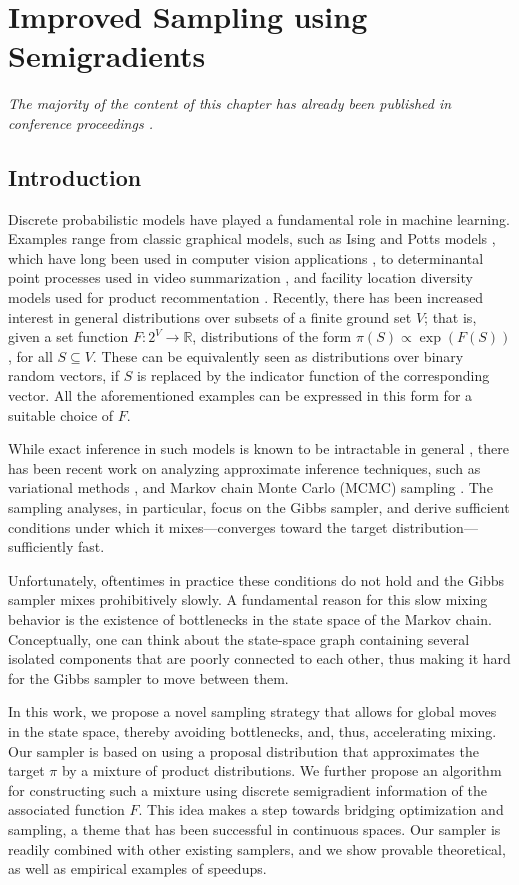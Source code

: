 \chapter{Improved Sampling using Semigradients} \label{ch:m3}

\emph{The majority of the content of this chapter has already been published in conference proceedings \citep{gotovos18}.}

\section{Introduction}
Discrete probabilistic models have played a fundamental role in machine learning.
Examples range from classic graphical models, such as Ising and Potts models \citep{koller09}, which have long been used in computer vision applications \citep{boykov01}, to determinantal point processes \citep{kulesza12} used in video summarization \citep{gong14}, and facility location diversity models used for product recommentation \citep{tschiatschek16}.
Recently, there has been increased interest in general distributions over subsets of a finite ground set $V$; that is, given a set function $F : 2^V \to \mathbb{R}$, distributions of the form $\pi(S) \propto \exp(F(S))$, for all $S \subseteq V$.
These can be equivalently seen as distributions over binary random vectors, if $S$ is replaced by the indicator function of the corresponding vector.
All the aforementioned examples can be expressed in this form for a suitable choice of $F$.

While exact inference in such models is known to be intractable in general \citep{jerrum93}, there has been recent work on analyzing approximate inference techniques, such as variational methods \citep{djolonga14, djolonga16mixed}, and Markov chain Monte Carlo (MCMC) sampling \citep{gotovos15, rebeschini15}.
The sampling analyses, in particular, focus on the Gibbs sampler, and derive sufficient conditions under which it mixes---converges toward the target distribution---sufficiently fast.

Unfortunately, oftentimes in practice these conditions do not hold and the Gibbs sampler mixes prohibitively slowly.
A fundamental reason for this slow mixing behavior is the existence of bottlenecks in the state space of the Markov chain.
Conceptually, one can think about the state-space graph containing several isolated components that are poorly connected to each other, thus making it hard for the Gibbs sampler to move between them.

In this work, we propose a novel sampling strategy that allows for global moves in the state space, thereby avoiding bottlenecks, and, thus, accelerating mixing.
Our sampler is based on using a proposal distribution that approximates the target $\pi$ by a mixture of product distributions.
We further propose an algorithm for constructing such a mixture using discrete semigradient information of the associated function $F$.
This idea makes a step towards bridging optimization and sampling, a theme that has been successful in continuous spaces.
Our sampler is readily combined with other existing samplers, and we show provable theoretical, as well as empirical examples of speedups.


